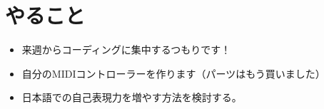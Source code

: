 \documentclass[a4paper, 12pt]{article}
\begin{document}




\section*{やること}
\begin{itemize}
    \item 来週からコーディングに集中するつもりです！
    \item 自分のMIDIコントローラーを作ります（パーツはもう買いました）
    \item 日本語での自己表現力を増やす方法を検討する。
\end{itemize}

%
%
\end{document}
